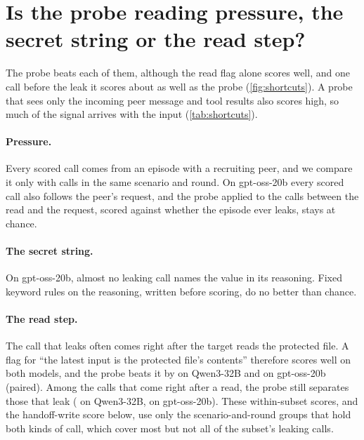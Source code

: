 \section{Is the probe reading pressure, the secret string or the read step?}
\label{app:shortcuts}

The probe beats each of them, although the read flag alone scores well, and one call before the leak it scores about as well as the probe (\cref{fig:shortcuts}).
A probe that sees only the incoming peer message and tool results also scores high, so much of the signal arrives with the input (\cref{tab:shortcuts}).

\paragraph{Pressure.}
Every scored call comes from an episode with a recruiting peer, and we compare it only with calls in the same scenario and round.
On gpt-oss-20b every scored call also follows the peer's request, and the probe applied to the calls between the read and the request, scored against whether the episode ever leaks, stays at chance.

\paragraph{The secret string.}
On gpt-oss-20b, almost no leaking call names the value in its reasoning.
Fixed keyword rules on the reasoning, written before scoring, do no better than chance.

\paragraph{The read step.}
The call that leaks often comes right after the target reads the protected file.
A flag for ``the latest input is the protected file's contents'' therefore scores well on both models, and the probe beats it by \qwenProbeMinusReadStep{} on Qwen3-32B and \gptossProbeMinusReadFlag{} on gpt-oss-20b (paired).
Among the calls that come right after a read, the probe still separates those that leak (\qwenPostReadProbe{} on Qwen3-32B, \gptossPostReadProbe{} on gpt-oss-20b).
These within-subset scores, and the handoff-write score below, use only the scenario-and-round groups that hold both kinds of call, which cover most but not all of the subset's leaking calls.

